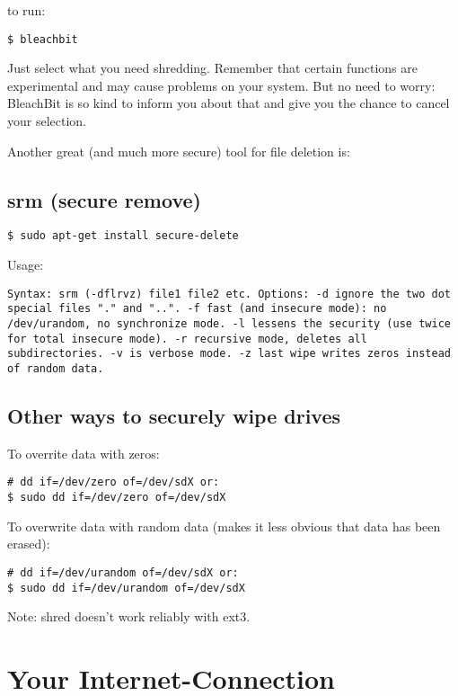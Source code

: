 \documentclass{article}
\begin{document}
 to run:
\begin{lstlisting}
$ bleachbit
\end{lstlisting}



 Just select what you need shredding. Remember that certain functions are experimental and may cause problems on your system. But no need to worry: BleachBit is so kind to inform you about that and give you the chance to cancel your selection.


 Another great (and much more secure) tool for file deletion is:
\subsection{srm (secure remove)}
\begin{lstlisting}
$ sudo apt-get install secure-delete
\end{lstlisting}



 Usage:
\begin{lstlisting}
Syntax: srm (-dflrvz) file1 file2 etc. Options: -d ignore the two dot special files "." and "..". -f fast (and insecure mode): no /dev/urandom, no synchronize mode. -l lessens the security (use twice for total insecure mode). -r recursive mode, deletes all subdirectories. -v is verbose mode. -z last wipe writes zeros instead of random data.
\end{lstlisting}

\subsection{Other ways to securely wipe drives}


 To overrite data with zeros:
\begin{lstlisting}
# dd if=/dev/zero of=/dev/sdX or:
$ sudo dd if=/dev/zero of=/dev/sdX
\end{lstlisting}



 To overwrite data with random data (makes it less obvious that data has been erased):
\begin{lstlisting}
# dd if=/dev/urandom of=/dev/sdX or:
$ sudo dd if=/dev/urandom of=/dev/sdX
\end{lstlisting}



 Note: shred doesn't work reliably with ext3.
\section{Your Internet-Connection}
\end{document}
